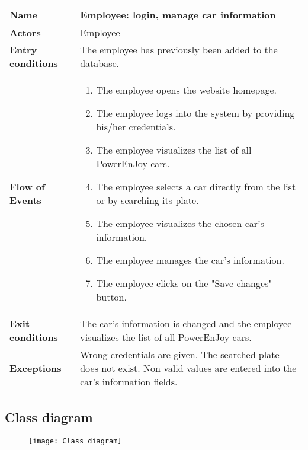 \begin{itemize}
\begin{table}[H]
\begin{tabular}{| m{3.5cm} | m{9.5cm} |}
		\hline
		\textbf{Name} & Employee: login, manage car information\\
		\hline
		\textbf{Actors} & Employee\\
		\hline
		\textbf{Entry conditions} & The employee has previously been added to the database.\\
		\hline
		\textbf{Flow of Events} & 
		\begin{enumerate}
			\item The employee opens the website homepage.
			\item The employee logs into the system by providing his/her credentials.
			\item The employee visualizes the list of all PowerEnJoy cars.
			\item The employee selects a car directly from the list or by searching its plate.
			\item The employee visualizes the chosen car's information.
			\item The employee manages the car's information. 
			\item The employee clicks on the "Save changes" button.  
		\end{enumerate} \\
		\hline
		\textbf{Exit conditions} & The car's information is changed and the employee visualizes the list of all PowerEnJoy cars.\\
		\hline
		\textbf{Exceptions} & Wrong credentials are given. The searched plate does not exist. Non valid values are entered into the car's information fields.\\
		\hline
	\end{tabular}
\end{table}
\end{itemize}
\subsection{Class diagram}
\begin{figure}[H]
	\centering
	\texttt{[image: Class\_diagram]}
\end{figure}
